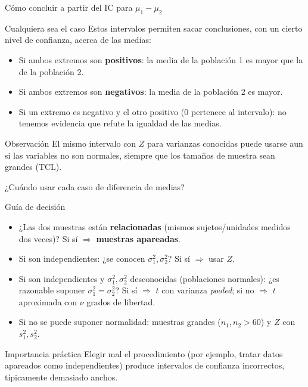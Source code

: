 \documentclass[aspectratio=169,11pt]{beamer}
\begin{document}
\begin{frame}{Cómo concluir a partir del IC para $\mu_1-\mu_2$}
\begin{block}{Cualquiera sea el caso}
Estos intervalos permiten sacar conclusiones, con un cierto nivel de confianza, acerca de las medias:
\begin{itemize}
\item Si ambos extremos son \textbf{positivos}: la media de la población 1 es mayor que la de la población 2.
\item Si ambos extremos son \textbf{negativos}: la media de la población 2 es mayor.
\item Si un extremo es negativo y el otro positivo ($0$ pertenece al intervalo): no tenemos evidencia que refute la igualdad de las medias.
\end{itemize}
\end{block}
\begin{alertblock}{Observación}
El mismo intervalo con $Z$ para varianzas conocidas puede usarse aun si las variables no son normales, siempre que los tamaños de muestra sean grandes (TCL).
\end{alertblock}
\end{frame}

\begin{frame}{¿Cuándo usar cada caso de diferencia de medias?}
\begin{block}{Guía de decisión}
\begin{itemize}
\item ¿Las dos muestras están \textbf{relacionadas} (mismos sujetos/unidades medidos dos veces)? Si sí $\Rightarrow$ \textbf{muestras apareadas}.
\item Si son independientes: ¿se conocen $\sigma_1^2,\sigma_2^2$? Si sí $\Rightarrow$ usar $Z$.
\item Si son independientes y $\sigma_1^2,\sigma_2^2$ desconocidas (poblaciones normales): ¿es razonable suponer $\sigma_1^2=\sigma_2^2$? Si sí $\Rightarrow$ $t$ con varianza \emph{pooled}; si no $\Rightarrow$ $t$ aproximada con $\nu$ grados de libertad.
\item Si no se puede suponer normalidad: muestras grandes ($n_1,n_2>60$) y $Z$ con $s_1^2,s_2^2$.
\end{itemize}
\end{block}
\begin{alertblock}{Importancia práctica}
Elegir mal el procedimiento (por ejemplo, tratar datos apareados como independientes) produce intervalos de confianza incorrectos, típicamente demasiado anchos.
\end{alertblock}
\end{frame}
\end{document}
